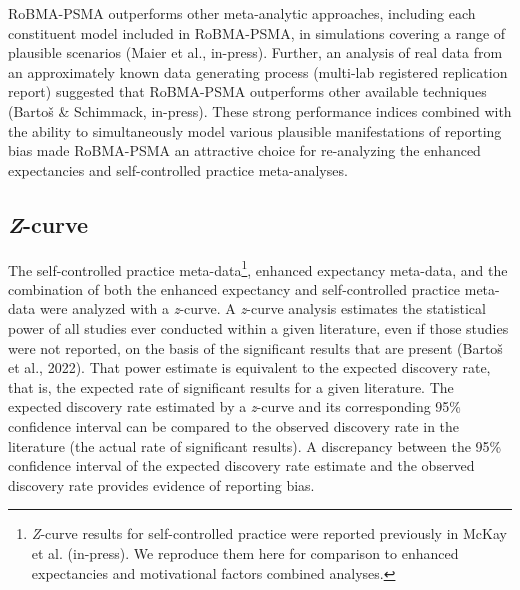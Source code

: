 \documentclass[
  doc, donotrepeattitle,floatsintext]{apa7}
\begin{document}
RoBMA-PSMA outperforms other meta-analytic approaches, including each constituent model included in RoBMA-PSMA, in simulations covering a range of plausible scenarios (Maier et al., in-press). Further, an analysis of real data from an approximately known data generating process (multi-lab registered replication report) suggested that RoBMA-PSMA outperforms other available techniques (Bartoš \& Schimmack, in-press). These strong performance indices combined with the ability to simultaneously model various plausible manifestations of reporting bias made RoBMA-PSMA an attractive choice for re-analyzing the enhanced expectancies and self-controlled practice meta-analyses.

\hypertarget{z-curve}{%
\subsection{\texorpdfstring{\emph{Z}-curve}{Z-curve}}\label{z-curve}}

The self-controlled practice meta-data\footnote{\emph{Z}-curve results for self-controlled practice were reported previously in McKay et al. (in-press). We reproduce them here for comparison to enhanced expectancies and motivational factors combined analyses.}, enhanced expectancy meta-data, and the combination of both the enhanced expectancy and self-controlled practice meta-data were analyzed with a \emph{z}-curve. A \emph{z}-curve analysis estimates the statistical power of all studies ever conducted within a given literature, even if those studies were not reported, on the basis of the significant results that are present (Bartoš et al., 2022). That power estimate is equivalent to the expected discovery rate, that is, the expected rate of significant results for a given literature. The expected discovery rate estimated by a \emph{z}-curve and its corresponding 95\% confidence interval can be compared to the observed discovery rate in the literature (the actual rate of significant results). A discrepancy between the 95\% confidence interval of the expected discovery rate estimate and the observed discovery rate provides evidence of reporting bias.
\end{document}
